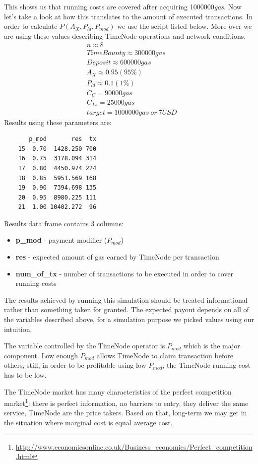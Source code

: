\documentclass{report}
\begin{document}
\begin{appendices}
  This shows us that running costs are covered after acquiring 1000000\textit{gas}. Now let's take a look at how this translates to the amount of executed transactions. In order to calculate $P(A_{X}, P_{ld}, P_{mod})$ we use the script listed below. More over we are using these values describing TimeNode operations and network conditions.
  \begin{align*}
  &n \approx 8\\
  &TimeBounty \approx 300000gas\\
  &Deposit \approx 600000gas\\
  &A_{X} \approx 0.95 (95\%)\\
  &P_{ld} \approx 0.1 (1\%)\\
  &C_{C} = 90000gas\\
  &C_{Tx} = 25000gas\\
  &target = 1000000gas~or~7USD
  \end{align*}
  Results using these parameters are:
  \begin{verbatim}
       p_mod       res  tx
    15  0.70  1428.250 700
    16  0.75  3178.094 314
    17  0.80  4450.974 224
    18  0.85  5951.569 168
    19  0.90  7394.698 135
    20  0.95  8980.225 111
    21  1.00 10402.272  96
  \end{verbatim}
  Results data frame contains 3 columns:
  \begin{itemize}
  \item \textbf{p\_mod} - payment modifier ($P_{mod}$)
  \item \textbf{res} - expected amount of gas earned by TimeNode per transaction
  \item \textbf{num\_of\_tx} - number of transactions to be executed in order to cover running costs
  \end{itemize}
  
  The results achieved by running this simulation should be treated informational rather than something taken for granted. The expected payout depends on all of the variables described above, for a simulation purpose we picked values using our intuition.
  
  The variable controlled by the TimeNode operator is $P_{mod}$ which is the major component. Low enough $P_{mod}$ allows TimeNode to claim transaction before others, still, in order to be profitable using low $P_{mod} $, the TimeNode running cost has to be low.     
  
  The TimeNode market has many characteristics of the perfect competition market\footnote{\url{http://www.economicsonline.co.uk/Business_economics/Perfect_competition.html}}: there is perfect information, no barriers to entry, they deliver the same service, TimeNode are the price takers. Based on that, long-term we may get in the situation where marginal cost is equal average cost. 
  \end{appendices}
  
\end{document}
